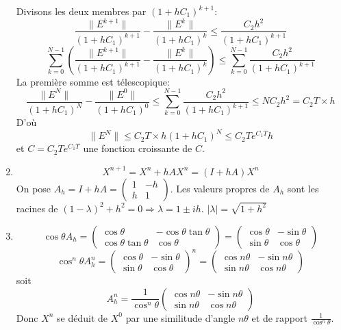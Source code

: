 \documentclass[a4paper]{article}
\begin{document}
\begin{enumerate}
Divisons les deux membres par $(1+hC_1)^{k+1}$:
\[\frac{\|E^{k+1}\|}{(1+hC_1)^{k+1}}- \frac{\|E^{k}\|}{(1+hC_1)^{k}}\leq \frac{C_2h^2}{(1+hC_1)^{k+1}}\]
\[\sum_{k=0}^{N-1}\left(\frac{\|E^{k+1}\|}{(1+hC_1)^{k+1}}- \frac{\|E^{k}\|}{(1+hC_1)^{k}}\right)\leq \sum_{k=0}^{N-1}\frac{C_2h^2}{(1+hC_1)^{k+1}}\]
La première somme est télescopique:
\[\frac{\|E^{N}\|}{(1+hC_1)^{N}}- \frac{\|E^{0}\|}{(1+hC_1)^{0}}\leq \sum_{k=0}^{N-1}\frac{C_2h^2}{(1+hC_1)^{k+1}}\leq NC_2h^2=C_2 T\times h\]
D'où 
\[\|E^{N}\|\leq C_2 T\times h (1+hC_1)^{N}\leq C_2Te^{C_1 T}h\]
et $C=C_2Te^{C_1 T}$ une fonction croissante de $C$.
\item 
\[X^{n+1}=X^n+h AX^n=(I+hA)X^n\]
On pose $A_h=I+hA=\left(\begin{array}{cc}
1&-h\\
h& 1
\end{array}\right)$. Les valeurs propres de $A_h$ sont les racines de $(1-\lambda)^2+h^2=0\Longrightarrow \lambda =1\pm i h$. $|\lambda|=\sqrt{1+h^2}$
\item 
\[\cos\theta A_h=\left(\begin{array}{cc}
\cos\theta &-\cos\theta\tan \theta\\
\cos\theta\tan \theta& \cos\theta
\end{array}\right)=\left(\begin{array}{cc}
\cos\theta &-\sin\theta\\
\sin\theta& \cos\theta
\end{array}\right)\]
\[\cos^n\theta A^n_h=\left(\begin{array}{cc}
\cos\theta &-\sin\theta\\
\sin\theta& \cos\theta
\end{array}\right)^n=\left(\begin{array}{cc}
\cos n\theta &-\sin n\theta\\
\sin n\theta& \cos n\theta
\end{array}\right)\]
soit
\[A^n_h=\frac{1}{\cos^n\theta }\left(\begin{array}{cc}
\cos n\theta &-\sin n\theta\\
\sin n\theta& \cos n\theta
\end{array}\right)\]
Donc $X^n$ se déduit de $X^0$ par une similitude d'angle $n\theta$ et de rapport $\frac{1}{\cos^n\theta }$.


\end{enumerate}
\end{document}
